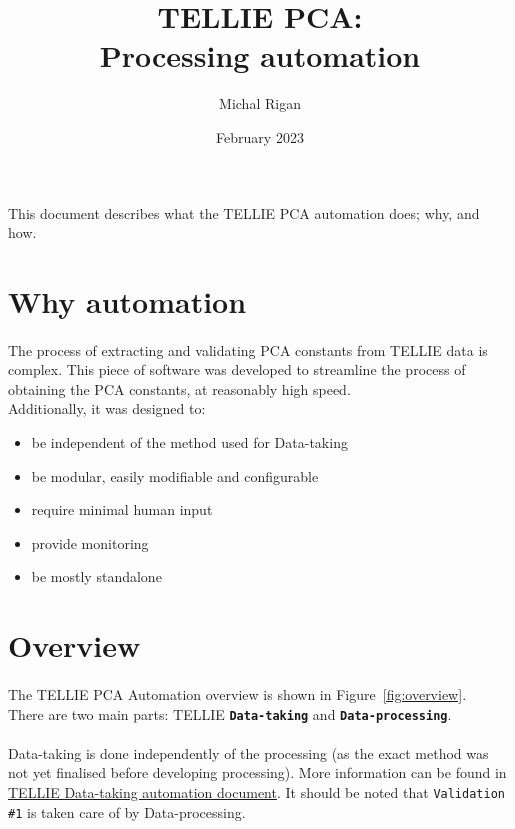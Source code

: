\documentclass[12pt]{article}
\title{\textbf{TELLIE PCA: \\ Processing automation}}
\date{February 2023}
\author{Michal Rigan}
\begin{document}
\maketitle{}

\vspace{7cm}
\paragraph{}
This document describes what the TELLIE PCA automation does; why, and how.
\clearpage

\tableofcontents

\clearpage

\section{Why automation}
\paragraph{}
The process of extracting and validating PCA constants from TELLIE data is complex. This piece of software was developed to streamline the process of obtaining the PCA constants, at reasonably high speed. \\
Additionally, it was designed to:
\begin{itemize}
	\item be independent of the method used for Data-taking
	\item be modular, easily modifiable and configurable
	\item require minimal human input
	\item provide monitoring
	\item be mostly standalone
\end{itemize}

\section{Overview}
\paragraph{}
The TELLIE PCA Automation overview is shown in Figure~\ref{fig:overview}.\\There are two main parts: TELLIE \textbf{\texttt{Data-taking}} and \textbf{\texttt{Data-processing}}.

\paragraph{}
Data-taking is done independently of the processing (as the exact method was not yet finalised before developing processing). More information can be found in \href{https://www.snolab.ca/snoplus/private/DocDB/cgi/ShowDocument?docid=7612}{TELLIE Data-taking automation document}. It should be noted that \texttt{Validation \#1} is taken care of by Data-processing.
\end{document}
